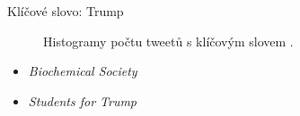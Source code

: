\documentclass[notheorems,12pt]{beamer}
\begin{document}
\begin{frame}{Klíčové slovo: Trump}
    \vspace{-2cm}\hspace{-5cm}
    \begin{figure}
        \centering
        \vspace{-0.7cm}
        \caption*{Histogramy počtu tweetů s klíčovým slovem \textit{}.}
    \end{figure}
	\begin{itemize}
		\item \textit{Biochemical Society}
		\item \textit{Students for Trump}
	\end{itemize}
\end{frame}
\end{document}
